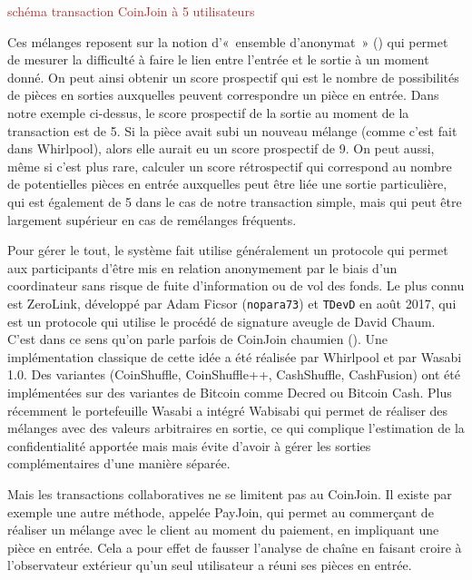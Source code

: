 \textcolor{brown}{schéma transaction CoinJoin à 5 utilisateurs}

Ces mélanges reposent sur la notion d'«~ensemble d'anonymat~» () qui permet de mesurer la difficulté à faire le lien entre l'entrée et le sortie à un moment donné. On peut ainsi obtenir un score prospectif qui est le nombre de possibilités de pièces en sorties auxquelles peuvent correspondre un pièce en entrée. Dans notre exemple ci-dessus, le score prospectif de la sortie au moment de la transaction est de 5. Si la pièce avait subi un nouveau mélange (comme c'est fait dans Whirlpool), alors elle aurait eu un score prospectif de 9. On peut aussi, même si c'est plus rare, calculer un score rétrospectif qui correspond au nombre de potentielles pièces en entrée auxquelles peut être liée une sortie particulière, qui est également de 5 dans le cas de notre transaction simple, mais qui peut être largement supérieur en cas de remélanges fréquents. 

Pour gérer le tout, le système fait utilise généralement un protocole qui permet aux participants d'être mis en relation anonymement par le biais d'un coordinateur sans risque de fuite d'information ou de vol des fonds. Le plus connu est ZeroLink, développé par Adam Ficsor (\texttt{nopara73}) et \texttt{TDevD} en août 2017, qui est un protocole qui utilise le procédé de signature aveugle de David Chaum. C'est dans ce sens qu'on parle parfois de CoinJoin chaumien (). Une implémentation classique de cette idée a été réalisée par Whirlpool et par Wasabi 1.0. Des variantes (CoinShuffle, CoinShuffle++, CashShuffle, CashFusion) ont été implémentées sur des variantes de Bitcoin comme Decred ou Bitcoin Cash. Plus récemment le portefeuille Wasabi a intégré Wabisabi qui permet de réaliser des mélanges avec des valeurs arbitraires en sortie, ce qui complique l'estimation de la confidentialité apportée mais mais évite d'avoir à gérer les sorties complémentaires d'une manière séparée.

Mais les transactions collaboratives ne se limitent pas au CoinJoin. Il existe par exemple une autre méthode, appelée PayJoin, qui permet au commerçant de réaliser un mélange avec le client au moment du paiement, en impliquant une pièce en entrée. Cela a pour effet de fausser l'analyse de chaîne en faisant croire à l'observateur extérieur qu'un seul utilisateur a réuni ses pièces en entrée.

